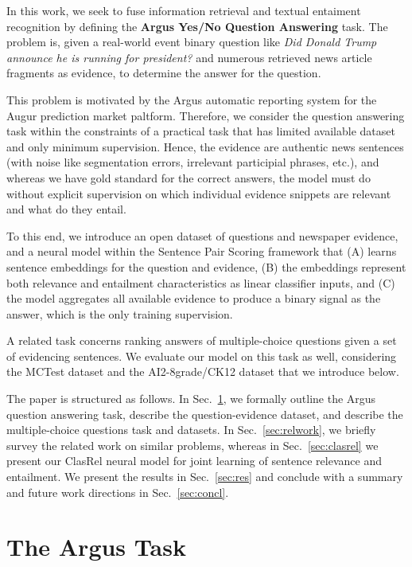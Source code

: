 \documentclass[11pt]{article}
\begin{document}
In this work, we seek to fuse information retrieval and textual entaiment
recognition by defining the \textbf{Argus Yes/No Question Answering} task.
The problem is, given a real-world event binary question like
\textit{Did Donald Trump announce he is running for president?}
and numerous retrieved news article fragments as evidence,
to determine the answer for the question.

This problem is motivated by the Argus automatic reporting system for
the Augur prediction market paltform. \cite{argus}  Therefore, we consider the question answering task
within the constraints of a practical task that has limited available dataset
and only minimum supervision.  Hence, the evidence are authentic news
sentences (with noise like segmentation errors, irrelevant participial phrases, etc.),
and whereas we have gold standard for
the correct answers, the model must do without explicit supervision on
which individual evidence snippets are relevant and what do they entail.

To this end, we introduce an open dataset of questions and newspaper evidence,
and a neural model within the Sentence Pair Scoring framework \cite{sps}
that (A) learns sentence embeddings for the question and evidence,
(B) the embeddings represent both relevance and entailment characteristics
as linear classifier inputs, and (C) the model aggregates all available evidence
to produce a binary signal as the answer, which is the only training supervision.

A related task concerns ranking answers of multiple-choice questions given
a set of evidencing sentences.  We evaluate our model on this task as well,
considering the MCTest dataset and the AI2-8grade/CK12 dataset that we introduce
below.

The paper is structured as follows.  In Sec.~\ref{sec:argus}, we formally outline
the Argus question answering task, describe the question-evidence dataset,
and describe the multiple-choice questions task and datasets.
In Sec.~\ref{sec:relwork}, we briefly survey the related work on similar problems,
whereas in Sec.~\ref{sec:clasrel} we present our ClasRel neural model for joint
learning of sentence relevance and entailment.  We present the results in Sec.~\ref{sec:res}
and conclude with a summary and future work directions in Sec.~\ref{sec:concl}.

\section{The Argus Task}
\label{sec:argus}
\end{document}
